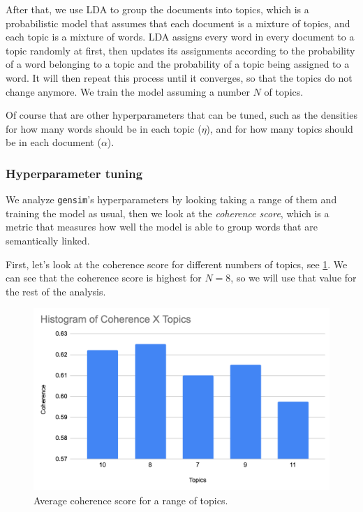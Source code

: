 \documentclass[11pt, conference, onecolumn, final]{IEEEtran}
\begin{document}
After that, we use  LDA to group the
documents into topics, which is a probabilistic model that assumes that each
document is a mixture of topics, and each topic is a mixture of words.
LDA assigns every word in every document to a topic randomly at first, then
updates its assignments according to the probability of a word belonging to a
topic and the probability of a topic being assigned to a word.
It will then repeat this process until it converges, so that the topics do not
change anymore.
We train the model assuming a number $N$ of topics.

Of course that are other hyperparameters that can be tuned, such as the
densities for how many words should be in each topic ($\eta$), and for how many
topics should be in each document ($\alpha$).

\subsubsection{Hyperparameter tuning} \label{sec:methodology:statistics-hyper}

We analyze \verb|gensim|'s hyperparameters by looking taking a range of them
and training the model as usual, then we look at the \textit{coherence score},
which is a metric that measures how well the model is able to group words that
are semantically linked.

First, let's look at the coherence score for different numbers of topics, see
\cref{fig:coherenceXtopics}.
We can see that the coherence score is highest for $N = 8$, so we will use that
value for the rest of the analysis.

\begin{figure}[H]
    \centering
    \includegraphics[width=0.7\linewidth]{coherenceXtopics.png}
    \caption{Average coherence score for a range of topics.}
    \label{fig:coherenceXtopics}
\end{figure}
\end{document}
